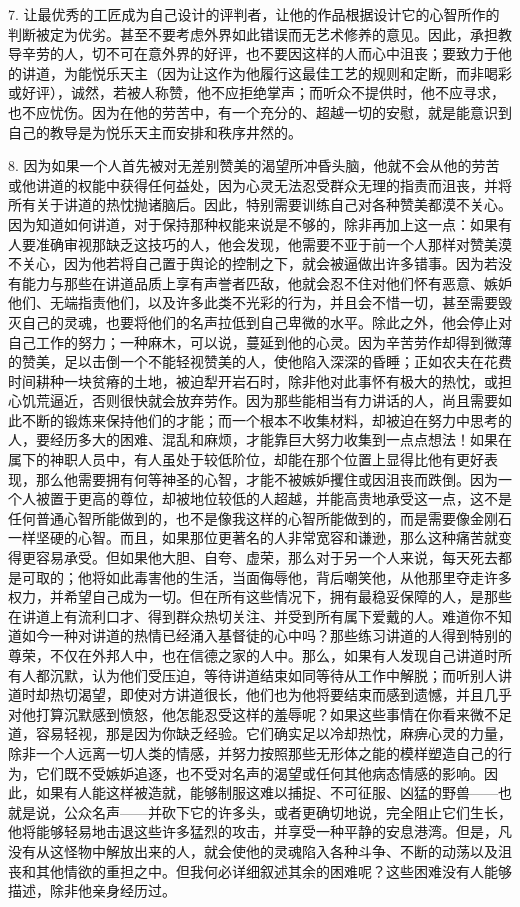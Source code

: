 7. 让最优秀的工匠成为自己设计的评判者，让他的作品根据设计它的心智所作的判断被定为优劣。甚至不要考虑外界如此错误而无艺术修养的意见。因此，承担教导辛劳的人，切不可在意外界的好评，也不要因这样的人而心中沮丧；要致力于他的讲道，为能悦乐天主（因为让这作为他履行这最佳工艺的规则和定断，而非喝彩或好评），诚然，若被人称赞，他不应拒绝掌声；而听众不提供时，他不应寻求，也不应忧伤。因为在他的劳苦中，有一个充分的、超越一切的安慰，就是能意识到自己的教导是为悦乐天主而安排和秩序井然的。\par

8. 因为如果一个人首先被对无差别赞美的渴望所冲昏头脑，他就不会从他的劳苦或他讲道的权能中获得任何益处，因为心灵无法忍受群众无理的指责而沮丧，并将所有关于讲道的热忱抛诸脑后。因此，特别需要训练自己对各种赞美都漠不关心。因为知道如何讲道，对于保持那种权能来说是不够的，除非再加上这一点：如果有人要准确审视那缺乏这技巧的人，他会发现，他需要不亚于前一个人那样对赞美漠不关心，因为他若将自己置于舆论的控制之下，就会被逼做出许多错事。因为若没有能力与那些在讲道品质上享有声誉者匹敌，他就会忍不住对他们怀有恶意、嫉妒他们、无端指责他们，以及许多此类不光彩的行为，并且会不惜一切，甚至需要毁灭自己的灵魂，也要将他们的名声拉低到自己卑微的水平。除此之外，他会停止对自己工作的努力；一种麻木，可以说，蔓延到他的心灵。因为辛苦劳作却得到微薄的赞美，足以击倒一个不能轻视赞美的人，使他陷入深深的昏睡；正如农夫在花费时间耕种一块贫瘠的土地，被迫犁开岩石时，除非他对此事怀有极大的热忱，或担心饥荒逼近，否则很快就会放弃劳作。因为那些能相当有力讲话的人，尚且需要如此不断的锻炼来保持他们的才能；而一个根本不收集材料，却被迫在努力中思考的人，要经历多大的困难、混乱和麻烦，才能靠巨大努力收集到一点点想法！如果在属下的神职人员中，有人虽处于较低阶位，却能在那个位置上显得比他有更好表现，那么他需要拥有何等神圣的心智，才能不被嫉妒攫住或因沮丧而跌倒。因为一个人被置于更高的尊位，却被地位较低的人超越，并能高贵地承受这一点，这不是任何普通心智所能做到的，也不是像我这样的心智所能做到的，而是需要像金刚石一样坚硬的心智。而且，如果那位更著名的人非常宽容和谦逊，那么这种痛苦就变得更容易承受。但如果他大胆、自夸、虚荣，那么对于另一个人来说，每天死去都是可取的；他将如此毒害他的生活，当面侮辱他，背后嘲笑他，从他那里夺走许多权力，并希望自己成为一切。但在所有这些情况下，拥有最稳妥保障的人，是那些在讲道上有流利口才、得到群众热切关注、并受到所有属下爱戴的人。难道你不知道如今一种对讲道的热情已经涌入基督徒的心中吗？那些练习讲道的人得到特别的尊荣，不仅在外邦人中，也在信德之家的人中。那么，如果有人发现自己讲道时所有人都沉默，认为他们受压迫，等待讲道结束如同等待从工作中解脱；而听别人讲道时却热切渴望，即使对方讲道很长，他们也为他将要结束而感到遗憾，并且几乎对他打算沉默感到愤怒，他怎能忍受这样的羞辱呢？如果这些事情在你看来微不足道，容易轻视，那是因为你缺乏经验。它们确实足以冷却热忱，麻痹心灵的力量，除非一个人远离一切人类的情感，并努力按照那些无形体之能的模样塑造自己的行为，它们既不受嫉妒追逐，也不受对名声的渴望或任何其他病态情感的影响。因此，如果有人能这样被造就，能够制服这难以捕捉、不可征服、凶猛的野兽——也就是说，公众名声——并砍下它的许多头，或者更确切地说，完全阻止它们生长，他将能够轻易地击退这些许多猛烈的攻击，并享受一种平静的安息港湾。但是，凡没有从这怪物中解放出来的人，就会使他的灵魂陷入各种斗争、不断的动荡以及沮丧和其他情欲的重担之中。但我何必详细叙述其余的困难呢？这些困难没有人能够描述，除非他亲身经历过。\par

